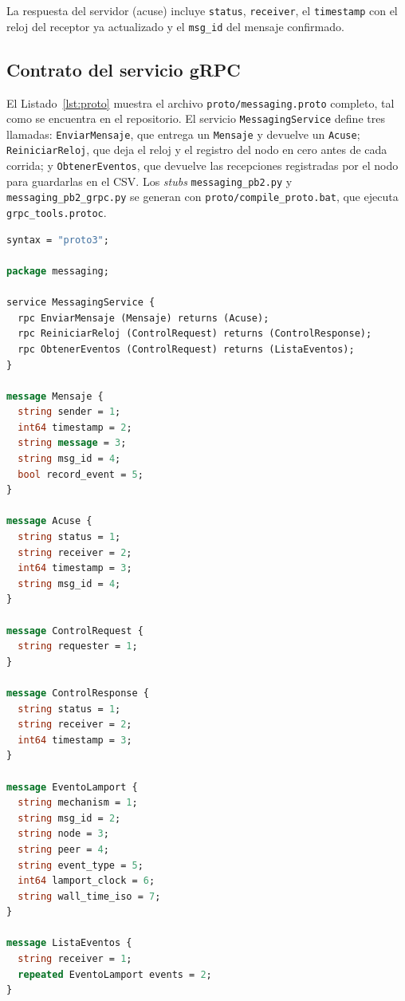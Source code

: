\documentclass[12pt,a4paper]{article}
\begin{document}
La respuesta del servidor (acuse) incluye \texttt{status}, \texttt{receiver}, el \texttt{timestamp} con el reloj del receptor ya actualizado y el \texttt{msg\_id} del mensaje confirmado.

\subsection{Contrato del servicio gRPC}

El Listado~\ref{lst:proto} muestra el archivo \texttt{proto/messaging.proto} completo, tal como se encuentra en el repositorio. El servicio \texttt{MessagingService} define tres llamadas: \texttt{EnviarMensaje}, que entrega un \texttt{Mensaje} y devuelve un \texttt{Acuse}; \texttt{ReiniciarReloj}, que deja el reloj y el registro del nodo en cero antes de cada corrida; y \texttt{ObtenerEventos}, que devuelve las recepciones registradas por el nodo para guardarlas en el CSV. Los \emph{stubs} \texttt{messaging\_pb2.py} y \texttt{messaging\_pb2\_grpc.py} se generan con \texttt{proto/compile\_proto.bat}, que ejecuta \texttt{grpc\_tools.protoc}.

\begin{lstlisting}[language=Protobuf, caption={Contrato del servicio en \texttt{proto/messaging.proto}.}, label={lst:proto}]
syntax = "proto3";

package messaging;

service MessagingService {
  rpc EnviarMensaje (Mensaje) returns (Acuse);
  rpc ReiniciarReloj (ControlRequest) returns (ControlResponse);
  rpc ObtenerEventos (ControlRequest) returns (ListaEventos);
}

message Mensaje {
  string sender = 1;
  int64 timestamp = 2;
  string message = 3;
  string msg_id = 4;
  bool record_event = 5;
}

message Acuse {
  string status = 1;
  string receiver = 2;
  int64 timestamp = 3;
  string msg_id = 4;
}

message ControlRequest {
  string requester = 1;
}

message ControlResponse {
  string status = 1;
  string receiver = 2;
  int64 timestamp = 3;
}

message EventoLamport {
  string mechanism = 1;
  string msg_id = 2;
  string node = 3;
  string peer = 4;
  string event_type = 5;
  int64 lamport_clock = 6;
  string wall_time_iso = 7;
}

message ListaEventos {
  string receiver = 1;
  repeated EventoLamport events = 2;
}
\end{lstlisting}
\end{document}
